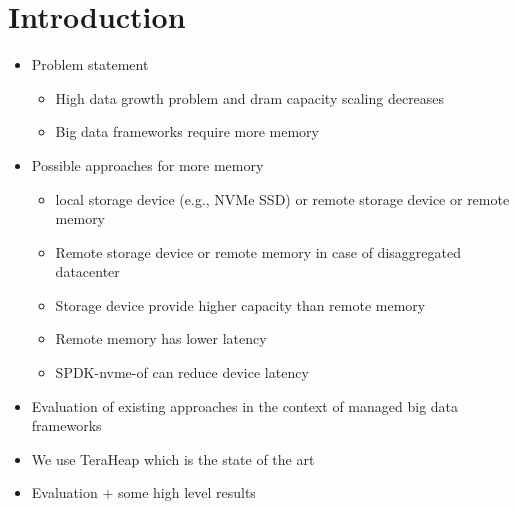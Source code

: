 \section{Introduction}

\begin{itemize}
  \item Problem statement
  \begin{itemize}
    \item High data growth problem and dram capacity scaling decreases
    \item Big data frameworks require more memory
  \end{itemize}

  \item Possible approaches for more memory
  \begin{itemize}
    \item local storage device (e.g., NVMe SSD) or remote storage device or
      remote memory 
    \item Remote storage device or remote memory in case of disaggregated
      datacenter
    \item Storage device provide higher capacity than remote memory
    \item Remote memory has lower latency
    \item SPDK-nvme-of can reduce device latency
  \end{itemize}

  \item Evaluation of existing approaches in the context of managed big data
    frameworks 
  \item We use TeraHeap which is the state of the art

  \item {Evaluation + some high level results}
\end{itemize}
